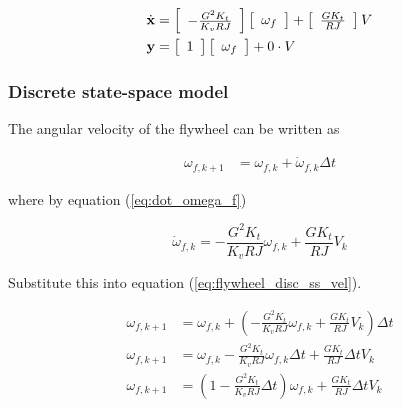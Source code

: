 \begin{align}
  \dot{\mathbf{x}} &= \left[
  \begin{array}{c}
    -\frac{G^2 K_t}{K_v RJ}
  \end{array}
  \right] \left[
  \begin{array}{c}
    \omega_f
  \end{array}
  \right] + \left[
  \begin{array}{c}
    \frac{G K_t}{RJ}
  \end{array}
  \right] V \\
  \mathbf{y} &= \left[
  \begin{array}{c}
    1
  \end{array}
  \right] \left[
  \begin{array}{c}
    \omega_f
  \end{array}
  \right] + 0 \cdot V
\end{align}

\subsubsection{Discrete state-space model}

The angular velocity of the flywheel can be written as

\begin{align}
  \omega_{f,k+1} &= \omega_{f,k} + \dot{\omega}_{f,k} \Delta t
    \label{eq:flywheel_disc_ss_vel}
\end{align}

where by equation (\ref{eq:dot_omega_f})

\begin{equation*}
  \dot{\omega}_{f,k} = -\frac{G^2 K_t}{K_v RJ} \omega_{f,k} +
    \frac{G K_t}{RJ} V_k
\end{equation*}

Substitute this into equation (\ref{eq:flywheel_disc_ss_vel}).

\begin{align}
  \omega_{f,k+1} &= \omega_{f,k} + \left(-\frac{G^2 K_t}{K_v RJ} \omega_{f,k} +
    \frac{G K_t}{RJ} V_k\right) \Delta t \nonumber \\
  \omega_{f,k+1} &= \omega_{f,k} - \frac{G^2 K_t}{K_v RJ} \omega_{f,k}
    \Delta t + \frac{G K_t}{RJ} \Delta t V_k \nonumber \\
  \omega_{f,k+1} &= \left(1 - \frac{G^2 K_t}{K_v RJ} \Delta t\right)
    \omega_{f,k} + \frac{G K_t}{RJ} \Delta t V_k \nonumber \\
\end{align}

